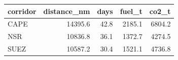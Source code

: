 \begin{tabular}{lrrrr}
\toprule
corridor &  distance\_nm &  days &  fuel\_t &  co2\_t \\
\midrule
    CAPE &      14395.6 &  42.8 &  2185.1 & 6804.2 \\
     NSR &      10836.8 &  36.1 &  1372.7 & 4274.5 \\
    SUEZ &      10587.2 &  30.4 &  1521.1 & 4736.8 \\
\bottomrule
\end{tabular}

